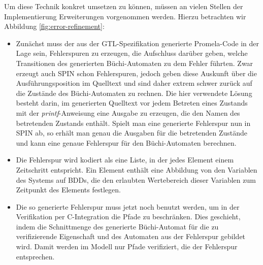 Um diese Technik konkret umsetzen zu können, müssen an vielen Stellen der Implementierung Erweiterungen vorgenommen werden.
Hierzu betrachten wir Abbildung \ref{fig:error-refinement}:
\begin{itemize}
\item Zunächst muss der aus der GTL-Spezifikation generierte Promela-Code in der Lage sein, Fehlerspuren zu erzeugen, die Aufschluss darüber geben, welche Transitionen des generierten Büchi-Automaten zu dem Fehler führten.
  Zwar erzeugt auch SPIN schon Fehlerspuren, jedoch geben diese Auskunft über die Ausführungsposition im Quelltext und sind daher extrem schwer zurück auf die Zustände des Büchi-Automaten zu rechnen.
  Die hier verwendete Lösung besteht darin, im generierten Quelltext vor jedem Betreten eines Zustands mit der \emph{printf}-Anweisung eine Ausgabe zu erzeugen, die den Namen des betretenden Zustands enthält.
  Spielt man eine generierte Fehlerspur nun in SPIN ab, so erhält man genau die Ausgaben für die betretenden Zustände und kann eine genaue Fehlerspur für den Büchi-Automaten berechnen.
\item Die Fehlerspur wird kodiert als eine Liste, in der jedes Element einem Zeitschritt entspricht.
  Ein Element enthält eine Abbildung von den Variablen des Systems auf BDDs, die den erlaubten Wertebereich dieser Variablen zum Zeitpunkt des Elements festlegen.
\item Die so generierte Fehlerspur muss jetzt noch benutzt werden, um in der Verifikation per C-Integration die Pfade zu beschränken.
  Dies geschieht, indem die Schnittmenge des generierte Büchi-Automat für die zu verifizierende Eigenschaft und des Automaten aus der Fehlerspur gebildet wird.
  Damit werden im Modell nur Pfade verifiziert, die der Fehlerspur entsprechen.
\end{itemize}
